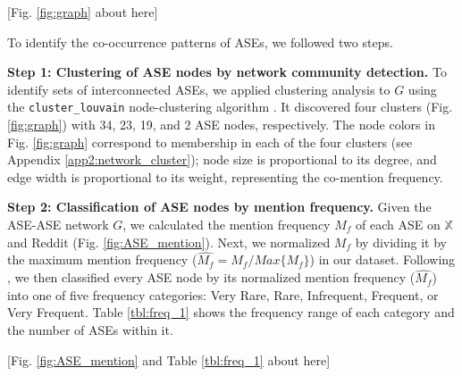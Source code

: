 \documentclass[referee,bst/sn-basic]{sn-jnl}%
\theoremstyle{thmstyletwo}%
\theoremstyle{thmstylethree}%
\begin{document}
\begin{center}
    [Fig. \ref{fig:graph} about here]
\end{center}

To identify the co-occurrence patterns of ASEs, we followed two steps.

\textbf{Step 1: Clustering of ASE nodes by network community detection.}
To identify sets of interconnected ASEs, we applied clustering analysis to $G$ using the \texttt{cluster\_louvain} node-clustering algorithm \cite{held2016dynamic}.
It discovered four clusters (Fig. \ref{fig:graph}) with 34, 23, 19, and 2 ASE nodes, respectively.
The node colors in Fig. \ref{fig:graph} correspond to membership in each of the four clusters (see Appendix \ref{app2:network_cluster}); node size is proportional to its degree, and edge width is proportional to its weight, representing the co-mention frequency.


\begin{comment}

 \begin{figure}
    \centering
    \texttt{[image: images/graph.pdf]}
    \caption{The ASE-ASE network $G$ based on social media posts.
    }
    \label{fig:graph}
\end{figure}

\end{comment}


\textbf{Step 2: Classification of ASE nodes by mention frequency.}
Given the ASE-ASE network $G$, we calculated the mention frequency $M_f$ of each ASE on $\mathbb{X}$ and Reddit (Fig. \ref{fig:ASE_mention}).
Next, we normalized $M_f$ by dividing it by the maximum mention frequency ($\hat{M_f} = M_f/Max\{M_f\}$) in our dataset. 
Following \cite{galeano2020predicting}, we then classified every ASE node by its normalized mention frequency ($\hat{M_f}$) into one of five frequency categories: Very Rare, Rare, Infrequent, Frequent, or Very Frequent.
Table \ref{tbl:freq_1} shows the frequency range of each category and the number of ASEs within it.


\begin{center}
    [Fig. \ref{fig:ASE_mention} and Table \ref{tbl:freq_1}  about here]
\end{center}

\begin{comment}
\begin{sidewaysfigure}
    \centering
    \texttt{[image: images/side\_effect\_distribution.pdf]}
    \caption{Long-tailed distribution of ASEs as aggregated groups by frequency of mentions on Reddit and $\mathbb{X}$.
             }
    \label{fig:ASE_mention}
\end{sidewaysfigure}

\end{comment}
\end{document}
